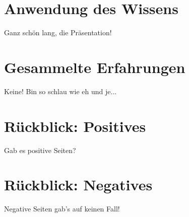 \documentclass[ignorenonframetext, 11pt, table]{beamer}
\begin{document}
\section*{Anwendung des Wissens}
\begin{frame}
Ganz schön lang, die Präsentation!
\end{frame}

\section*{Gesammelte Erfahrungen}
\begin{frame}
Keine! Bin so schlau wie eh und je...
\end{frame}

\section*{Rückblick: Positives}
\begin{frame}
Gab es positive Seiten?
\end{frame}

\section*{Rückblick: Negatives}
\begin{frame}
Negative Seiten gab's auf keinen Fall!
\end{frame}
\end{document}
